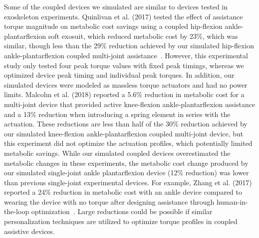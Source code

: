 \documentclass[10pt,letterpaper]{article}
\begin{document}
Some of the coupled devices we simulated are similar to devices tested in exoskeleton experiments. Quinlivan et al. (2017) tested the effect of assistance torque magnitude on metabolic cost savings using a coupled hip-flexion ankle-plantarflexion soft exosuit, which reduced metabolic cost by 23\%, which was similar, though less than the 29\% reduction achieved by our simulated hip-flexion ankle-plantarflexion coupled multi-joint assistance~\cite{Quinlivan:2017}. However, this experimental study only tested four peak torque values with fixed peak timings, whereas we optimized device peak timing and individual peak torques. In addition, our simulated devices were modeled as massless torque actuators and had no power limits. Malcolm et al. (2018) reported a 5.6\% reduction in metabolic cost for a multi-joint device that provided active knee-flexion ankle-plantarflexion assistance and a 13\% reduction when introducing a spring element in series with the actuation. These reductions are less than half of the 30\% reduction achieved by our simulated knee-flexion ankle-plantarflexion coupled multi-joint device, but this experiment did not optimize the actuation profiles, which potentially limited metabolic savings. While our simulated coupled devices overestimated the metabolic changes in these experiments, the metabolic cost change produced by our simulated single-joint ankle plantarflexion device (12\% reduction) was lower than previous single-joint experimental devices. For example, Zhang et al. (2017) reported a 24\% reduction in metabolic cost with an ankle device compared to wearing the device with no torque after designing assistance through human-in-the-loop optimization~\cite{Zhang:2017}. Large reductions could be possible if similar personalization techniques are utilized to optimize torque profiles in coupled assistive devices.
\end{document}

